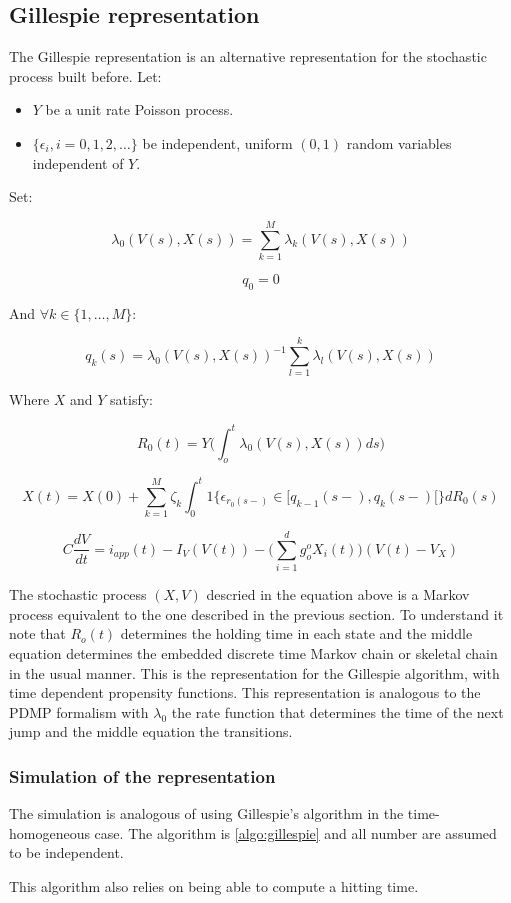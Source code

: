 	\subsection{Gillespie representation}
	The Gillespie representation is an alternative representation for the stochastic process built before.
	Let:

	\begin{itemize}
		\item $Y$ be a unit rate Poisson process.
		\item $\{\epsilon_i, i = 0, 1, 2, \dots\}$ be independent, uniform $(0,1)$ random variables independent of $Y$.
	\end{itemize}

	Set:

	$$\lambda_0(V(s), X(s)) = \sum\limits_{k=1}^M\lambda_k(V(s), X(s))$$

	$$q_0 = 0$$

	And $\forall k\in\{1, \dots, M\}$:

	$$q_k(s) = \lambda_0(V(s), X(s))^{-1}\sum\limits_{l=1}^k\lambda_l(V(s), X(s))$$

	Where $X$ and $Y$ satisfy:

	$$R_0(t) = Y\biggl(\int_o^t\lambda_0(V(s), X(s))ds\biggr)$$

	$$X(t) = X(0) + \sum\limits_{k=1}^M\zeta_k\int_0^t1\{\epsilon_{r_0(s-)}\in[q_{k-1}(s-), q_k(s-)[\}dR_0(s)$$

	$$C\frac{dV}{dt} = i_{app}(t)-I_V(V(t)) - \biggl(\sum\limits_{i=1}^dg_o^oX_i(t)\biggr)(V(t)-V_X)$$

	The stochastic process $(X, V)$ descried in the equation above is a Markov process equivalent to the one described in the previous section.
	To understand it note that $R_o(t)$ determines the holding time in each state and the middle equation determines the embedded discrete time Markov chain or skeletal chain in the usual manner.
	This is the representation for the Gillespie algorithm, with time dependent propensity functions.
	This representation is analogous to the PDMP formalism with $\lambda_0$ the rate function that determines the time of the next jump and the middle equation the transitions.

		\subsubsection{Simulation of the representation}
		The simulation is analogous of using Gillespie's algorithm in the time-homogeneous case.
		The algorithm is \ref{algo:gillespie} and all number are assumed to be independent.

		

		This algorithm also relies on being able to compute a hitting time.
